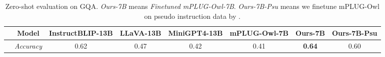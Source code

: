 
\begin{table}[t]
\setlength\tabcolsep{3pt}
\centering
\small
\begin{tabular}{lccccc|cc}
\toprule[1.5pt]
& Model& InstructBLIP-13B & LLaVA-13B & MiniGPT4-13B & mPLUG-Owl-7B &\textbf{Ours-7B}& Ours-7B-Psu \\
\midrule
&\textit{Accuracy} & 0.62 & 0.47 & 0.42 & 0.41 & \textbf{0.64}& 0.60\\
\bottomrule[1.5pt]
\end{tabular}
\vspace{-2mm}
\caption{
Zero-shot evaluation on GQA. \textit{Ours-7B} means \textit{Finetuned mPLUG-Owl-7B}. \textit{Ours-7B-Psu} means we finetune mPLUG-Owl on pseudo instruction data by \citep{wu2022grit}.}
\label{tab:GQA}
\vspace{-0.2in}
\end{table}


















